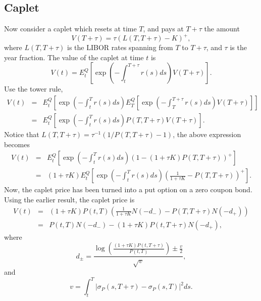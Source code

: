 \documentclass[12pt]{article}
\begin{document}
  \subsection{Caplet}

    Now consider a caplet which resets at time $T$, and pays at $T+\tau$ the amount
    \begin{equation}
      V(T+\tau) = \tau\left(L(T,T+\tau)-K\right)^+,
    \end{equation}
    where $L(T,T+\tau)$ is the LIBOR rates spanning from $T$ to $T+\tau$, and $\tau$
    is the year fraction. The value of the caplet at time $t$ is
    \begin{equation}
      V(t)=E_t^Q\left[\exp\left(-\int_t^{T+\tau}r(s)ds\right)V(T+\tau)\right].
    \end{equation}
    Use the tower rule,
    \begin{eqnarray}
      V(t)&=&E_t^Q\left[\exp\left(-\int_t^{T}r(s)ds\right)E_T^Q\left[\exp\left(-\int_T^{T+\tau}r(s)ds\right)V(T+\tau)\right]\right]\nonumber\\
          &=&E_t^Q\left[\exp\left(-\int_t^{T}r(s)ds\right)P(T,T+\tau)V(T+\tau)\right].
    \end{eqnarray}
    Notice that $L(T,T+\tau)=\tau^{-1}(1/P(T,T+\tau)-1)$, the above expression becomes
    \begin{eqnarray}
      V(t)&=&E_t^Q\left[\exp\left(-\int_t^{T}r(s)ds\right)\left(1-\left(1+\tau K\right)P(T,T+\tau)\right)^+\right]\nonumber\\
          &=&(1+\tau K)E_t^Q\left[\exp\left(-\int_t^{T}r(s)ds\right)\left(\frac{1}{1+\tau K}-P(T,T+\tau)\right)^+\right].
    \end{eqnarray}
    Now, the caplet price has been turned into a put option on a zero coupon bond. Using the earlier result, the caplet price is
    \begin{eqnarray}
      V(t)&=&(1+\tau K)P(t,T)\left(\frac{1}{1+\tau K}N(-d_-)-P(T,T+\tau)N(-d_+)\right)\nonumber\\
          &=&P(t,T)N(-d_-)-(1+\tau K)P(t,T+\tau)N(-d_+),
    \end{eqnarray}
    where
    \begin{equation}
      d_{\pm} = \frac{\displaystyle\log\left(\frac{(1+\tau K)P(t,T+\tau)}{P(t,T)}\right)\pm \frac{v}{2}}{\sqrt{v}},
    \end{equation}
    and
    \begin{equation}
      v=\int_t^T\left|\sigma_P(s,T+\tau)-\sigma_P(s,T)\right|^2ds.
    \end{equation}
\end{document}
